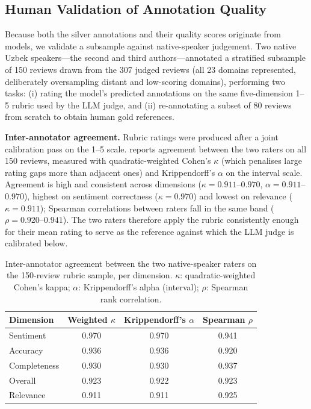 \documentclass[bdcc,article,submit,moreauthors]{Definitions/mdpi}
\begin{document}
\subsection{Human Validation of Annotation Quality}
\label{sec:res_human}

Because both the silver annotations and their quality scores originate from models, we validate a subsample against native-speaker judgement. Two native Uzbek speakers---the second and third authors---annotated a stratified subsample of 150 reviews drawn from the 307 judged reviews (all 23 domains represented, deliberately oversampling distant and low-scoring domains), performing two tasks: (i) rating the model's predicted annotations on the same five-dimension 1--5 rubric used by the LLM judge, and (ii) re-annotating a subset of 80 reviews from scratch to obtain human gold references.

\textbf{Inter-annotator agreement.} Rubric ratings were produced after a joint calibration pass on the 1--5 scale.  reports agreement between the two raters on all 150 reviews, measured with quadratic-weighted Cohen's $\kappa$ (which penalises large rating gaps more than adjacent ones) and Krippendorff's $\alpha$ on the interval scale. Agreement is high and consistent across dimensions ($\kappa = 0.911$--$0.970$, $\alpha = 0.911$--$0.970$), highest on sentiment correctness ($\kappa = 0.970$) and lowest on relevance ($\kappa = 0.911$); Spearman correlations between raters fall in the same band ($\rho = 0.920$--$0.941$). The two raters therefore apply the rubric consistently enough for their mean rating to serve as the reference against which the LLM judge is calibrated below.

\begin{table}[t]
\centering
\caption{Inter-annotator agreement between the two native-speaker raters on the 150-review rubric sample, per dimension. $\kappa$: quadratic-weighted Cohen's kappa; $\alpha$: Krippendorff's alpha (interval); $\rho$: Spearman rank correlation.}
\label{tab:iaa}
\begin{tabular}{lccc}
\toprule
\textbf{Dimension} & \textbf{Weighted $\kappa$} & \textbf{Krippendorff's $\alpha$} & \textbf{Spearman $\rho$} \\
\midrule
Sentiment    & 0.970 & 0.970 & 0.941 \\
Accuracy     & 0.936 & 0.936 & 0.920 \\
Completeness & 0.930 & 0.930 & 0.937 \\
Overall      & 0.923 & 0.922 & 0.923 \\
Relevance    & 0.911 & 0.911 & 0.925 \\
\bottomrule
\end{tabular}
\end{table}
\end{document}
